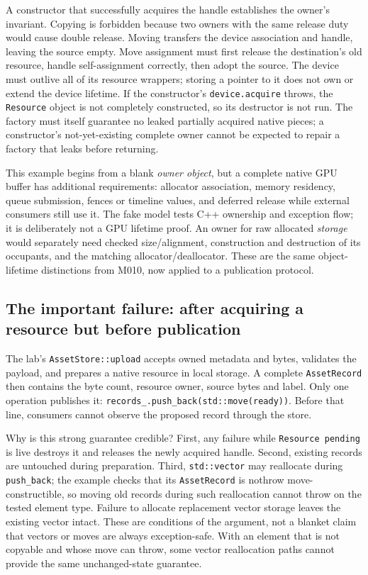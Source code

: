 A constructor that successfully acquires the handle establishes the owner's invariant. Copying is forbidden because two owners with the same release duty would cause double release. Moving transfers the device association and handle, leaving the source empty. Move assignment must first release the destination's old resource, handle self-assignment correctly, then adopt the source. The device must outlive all of its resource wrappers; storing a pointer to it does not own or extend the device lifetime. If the constructor's \texttt{device.acquire} throws, the \texttt{Resource} object is not completely constructed, so its destructor is not run. The factory must itself guarantee no leaked partially acquired native pieces; a constructor's not-yet-existing complete owner cannot be expected to repair a factory that leaks before returning.

This example begins from a blank \emph{owner object}, but a complete native GPU buffer has additional requirements: allocator association, memory residency, queue submission, fences or timeline values, and deferred release while external consumers still use it. The fake model tests C++ ownership and exception flow; it is deliberately not a GPU lifetime proof. An owner for raw allocated \emph{storage} would separately need checked size/alignment, construction and destruction of its occupants, and the matching allocator/deallocator. These are the same object-lifetime distinctions from M010, now applied to a publication protocol.

\subsection{The important failure: after acquiring a resource but before publication}\label{05-engine-i-ch004-the-important-failure-after-acquiring-a-resource-but-before-publication}

\hypertarget{05-engine-i-ch004-the-important-failure-after-acquiring-a-resource-but-before-publication}{}

The lab's \texttt{AssetStore::upload} accepts owned metadata and bytes, validates the payload, and prepares a native resource in local storage. A complete \texttt{AssetRecord} then contains the byte count, resource owner, source bytes and label. Only one operation publishes it: \texttt{records\_.push\_back(std::move(ready))}. Before that line, consumers cannot observe the proposed record through the store.

Why is this strong guarantee credible? First, any failure while \texttt{Resource\ pending} is live destroys it and releases the newly acquired handle. Second, existing records are untouched during preparation. Third, \texttt{std::vector} may reallocate during \texttt{push\_back}; the example checks that its \texttt{AssetRecord} is nothrow move-constructible, so moving old records during such reallocation cannot throw on the tested element type. Failure to allocate replacement vector storage leaves the existing vector intact. These are conditions of the argument, not a blanket claim that vectors or moves are always exception-safe. With an element that is not copyable and whose move can throw, some vector reallocation paths cannot provide the same unchanged-state guarantee.

